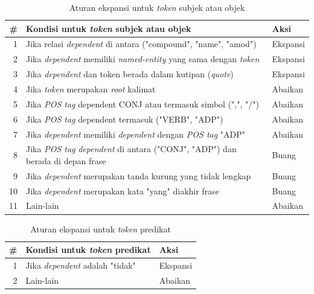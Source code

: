 \begin{table}
\caption{Aturan ekspansi untuk \textit{token} subjek atau objek}
\label{tab:token_expansion_rules_s_o}
\centering
\begin{tabular}{r p{10cm} l}
\hline
\textbf{\#} & \textbf{Kondisi untuk \textit{token} subjek atau objek} & \textbf{Aksi} \\
\hline
1 & Jika relasi \textit{dependent} di antara ("compound", "name", "amod") & Ekspansi \\
2 & Jika \textit{dependent} memiliki \textit{named-entity} yang sama dengan \textit{token}  & Ekspansi \\
3 & Jika \textit{dependent} dan token berada dalam kutipan (\textit{quote}) & Ekspansi \\
4 & Jika \textit{token} merupakan \textit{root} kalimat & Abaikan \\
5 & Jika \textit{POS tag} dependent CONJ atau termasuk simbol (",", "/") & Abaikan \\
6 & Jika \textit{POS tag} dependent termasuk ("VERB", "ADP")  & Abaikan \\
7 & Jika \textit{dependent} memiliki \textit{dependent} dengan \textit{POS tag} "ADP" & Abaikan \\
8 & Jika \textit{POS tag} \textit{dependent} di antara ("CONJ", "ADP") dan berada di depan frase & Buang \\
9 & Jika \textit{dependent} merupakan tanda kurung yang tidak lengkap & Buang \\
10 & Jika \textit{dependent} merupakan kata "yang" diakhir frase & Buang \\
11 & Lain-lain & Abaikan \\
\hline
\end{tabular}
\end{table}

\begin{table}
\caption{Aturan ekspansi untuk \textit{token} predikat}
\label{tab:token_expansion_rules_p}
\centering
\begin{tabular}{r p{10cm} l}
\hline
\textbf{\#} & \textbf{Kondisi untuk \textit{token} predikat} & \textbf{Aksi} \\
\hline
1 & Jika \textit{dependent} adalah "tidak" & Ekspansi \\
2 & Lain-lain & Abaikan \\
\hline
\end{tabular}
\end{table}

